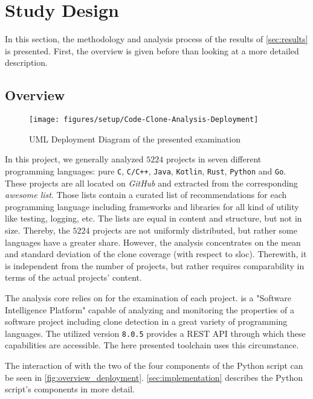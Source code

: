 
\section{Study Design}
\label{sec:study_design}

In this section, the methodology and analysis process of the results of \autoref{sec:results} is presented. First, the overview is given before than looking at a more detailed description.


\subsection{Overview}

\begin{figure}[htb]
	\centering
	\texttt{[image: figures/setup/Code-Clone-Analysis-Deployment]}
	\caption{UML Deployment Diagram of the presented examination}
	\label{fig:overview_deployment}
\end{figure}

In this project, we generally analyzed $5224$ projects in seven different programming languages: pure \texttt{C}, \texttt{C/C++}, \texttt{Java}, \texttt{Kotlin}, \texttt{Rust}, \texttt{Python} and \texttt{Go}. These projects are all located on \textit{GitHub} and extracted from the corresponding \textit{awesome list}\awesomeFootnote{}. Those lists contain a curated list of recommendations for each programming language including frameworks and libraries for all kind of utility like testing, logging, etc.
The lists are equal in content and structure, but not in size. Thereby, the $5224$ projects are not uniformly distributed, but rather some languages have a greater share. However, the analysis concentrates on the mean and standard deviation of the clone coverage (with respect to \ac{sloc}). Therewith, it is independent from the number of projects, but rather requires comparability in terms of the actual projects' content.

The analysis core relies on \teamscale{}\teamscaleFootnote{} for the examination of each project. \teamscale{} is a "Software Intelligence Platform" capable of analyzing and monitoring the properties of a software project including clone detection in a great variety of programming languages. The utilized version \texttt{8.0.5} provides a REST API through which these capabilities are accessible. The here presented toolchain uses this circumstance.

The interaction of \teamscale{} with the two of the four components of the Python script\gitFootnote{} can be seen in \autoref{fig:overview_deployment}. \autoref{sec:implementation} describes the Python script's components in more detail.

